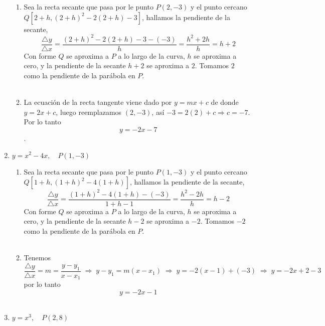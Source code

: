 \begin{enumerate}
\begin{enumerate}[\bfseries a)]
    
    \item Sea la recta secante que pasa por le punto $P(2,-3)$  y el punto cercano $Q\left[2+h, (2+h)^2 - 2(2+h) - 3\right]$, hallamos la pendiente de la secante, $$\dfrac{\triangle y}{\triangle x} = \dfrac{(2+h)^2 - 2(2+h) - 3 - (-3)}{h} = \dfrac{h^2 + 2h}{h} = h+2$$
    Con forme $Q$ se aproxima a $P$ a lo largo de la curva, $h$ se aproxima a cero, y la pendiente de la secante $h+2$ se aproxima a $2$. Tomamos $2$ como la pendiente de la parábola en $P$.\\\\

    \item La ecuación de la recta tangente viene dado por $y = mx + c$ de donde $y=2x+c$, luego reemplazamos $(2,-3)$, así $-3 = 2(2) + c \Longrightarrow c = -7$. Por lo tanto $$y = -2x - 7$$.\\

\end{enumerate}

\item $y=x^2-4x, \quad P(1,-3)$ 

\begin{enumerate}[\bfseries a)]
    
    \item Sea la recta secante que pasa por le punto $P(1,-3)$  y el punto cercano $Q\left[1+h, (1+h)^2 - 4(1+h) \right]$, hallamos la pendiente de la secante, $$\dfrac{\triangle y}{\triangle x} = \dfrac{(1+h)^2 - 4(1+h) - (-3)}{1+h - 1} = \dfrac{h^2 - 2h}{h} = h-2$$
    Con forme $Q$ se aproxima a $P$ a lo largo de la curva, $h$ se aproxima a cero, y la pendiente de la secante $h-2$ se aproxima a $-2$. Tomamos $-2$ como la pendiente de la parábola en $P$.\\\\

    \item Tenemos $$\dfrac{\triangle y}{\triangle x} = m = \dfrac{y - y_1}{x - x_1} \; \Longrightarrow \; y-y_1 = m(x-x_1) \; \Longrightarrow \; y = -2(x-1) + (-3) \; \Longrightarrow \; y = -2x+2 - 3$$ por lo tanto $$y = -2x-1$$\\
     

\end{enumerate}

\item $y=x^3, \quad P(2,8)$


\end{enumerate}
